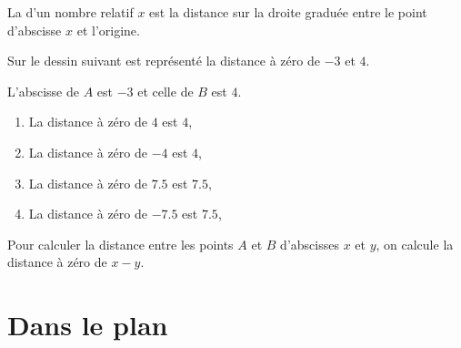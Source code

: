 \begin{definition}
    La  d'un nombre relatif \( x\) est la distance sur la droite graduée entre le point d'abscisse \( x\) et l'origine.
\end{definition}

\begin{example}
    Sur le dessin suivant est représenté la distance à zéro de \( -3\) et \( 4\).
    \begin{center}
        
    \end{center}
    L'abscisse de \( A\) est \( -3\) et celle de \( B\) est \( 4\).
\end{example}

\begin{example}
    \begin{enumerate}
        \item
            La distance à zéro de \( 4\) est \( 4\),
        \item
            La distance à zéro de \( -4\) est \( 4\),
        \item
            La distance à zéro de \( 7.5\) est \( 7.5\),
        \item
            La distance à zéro de \( -7.5 \) est \( 7.5\),
    \end{enumerate}
\end{example}

\begin{Aretenir}
    Pour calculer la distance entre les points \( A\) et \( B\) d'abscisses \( x\) et \( y\), on calcule la distance à zéro de \( x-y\).
\end{Aretenir}

\section{Dans le plan}





